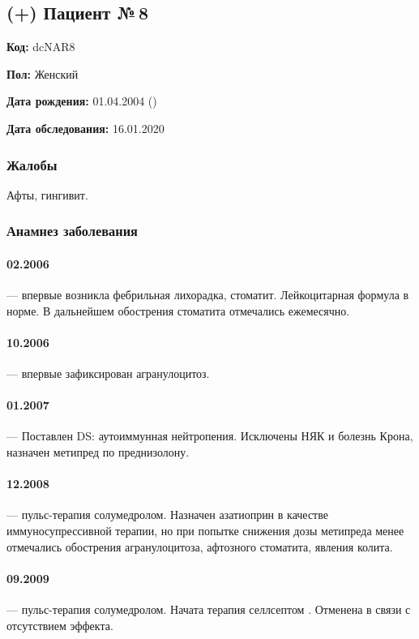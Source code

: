 \documentclass[a4paper,14pt]{extarticle}
\newcommand{\mgpkg}{мг/кг}
\newcommand{\mgpd}{мг/сут.}
\begin{document}
\newpage
\subsection*{(+) Пациент №\,8}

\textbf{Код:} dcNAR8

\textbf{Пол:} Женский

\textbf{Дата рождения:} 01.04.2004 ()

\textbf{Дата обследования:} 16.01.2020

\subsubsection*{Жалобы}

Афты, гингивит.

\subsubsection*{Анамнез заболевания}

\paragraph{02.2006} --- впервые возникла фебрильная лихорадка, стоматит. Лейкоцитарная формула в норме. В дальнейшем обострения стоматита отмечались ежемесячно.

\paragraph{10.2006} --- впервые зафиксирован агранулоцитоз.

\paragraph{01.2007} --- Поставлен DS: аутоиммунная нейтропения. Исключены НЯК и болезнь Крона, назначен метипред \numprint[\mgpkg]{1} по преднизолону.

\paragraph{12.2008} --- пульс-терапия солумедролом. Назначен азатиоприн \numprint[\mgpkg]{2} в качестве иммуносупрессивной терапии, но при попытке снижения дозы метипреда менее \numprint[\mgpkg]{3--4} отмечались обострения агранулоцитоза, афтозного стоматита, явления колита.

\paragraph{09.2009} --- пульс-терапия солумедролом. Начата терапия селлсептом \numprint[\mgpd]{750}. Отменена в связи с отсутствием эффекта.
\end{document}

